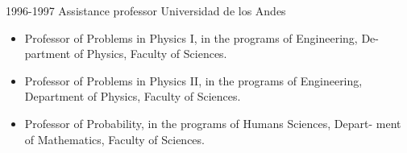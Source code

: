 \begin{entrylist}
  \entry
        {1996-1997}
	{Assistance professor}
	{Universidad de los Andes}
	{\begin{itemize}
              \item Professor of Problems in Physics I, in the programs of Engineering, De-
partment of Physics, Faculty of Sciences.
              \item Professor of Problems in Physics II, in the programs of Engineering,
Department of Physics, Faculty of Sciences.
              \item Professor of Probability, in the programs of Humans Sciences, Depart-
ment of Mathematics, Faculty of Sciences.
	\end{itemize}}
\end{entrylist}
